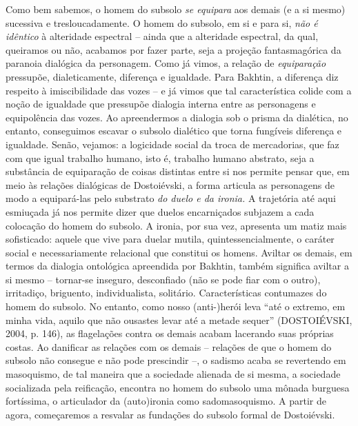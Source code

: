Como bem sabemos, o homem do subsolo \emph{se equipara} aos demais (e a
si mesmo) sucessiva e tresloucadamente. O homem do subsolo, em si e para
si, \emph{não é idêntico} à alteridade espectral -- ainda que a
alteridade espectral, da qual, queiramos ou não, acabamos por fazer
parte, seja a projeção fantasmagórica da paranoia dialógica da
personagem. Como já vimos, a relação de \emph{equiparação} pressupõe,
dialeticamente, diferença e igualdade. Para Bakhtin, a diferença diz
respeito à imiscibilidade das vozes -- e já vimos que tal característica
colide com a noção de igualdade que pressupõe dialogia interna entre as
personagens e equipolência das vozes. Ao apreendermos a dialogia sob o
prisma da dialética, no entanto, conseguimos escavar o subsolo dialético
que torna fungíveis diferença e igualdade. Senão, vejamos: a logicidade
social da troca de mercadorias, que faz com que igual trabalho humano,
isto é, trabalho humano abstrato, seja a substância de equiparação de
coisas distintas entre si nos permite pensar que, em meio às relações
dialógicas de Dostoiévski, a forma articula as personagens de modo a
equipará-las pelo substrato \emph{do duelo e da ironia.} A trajetória
até aqui esmiuçada já nos permite dizer que duelos encarniçados subjazem
a cada colocação do homem do subsolo. A ironia, por sua vez, apresenta
um matiz mais sofisticado: aquele que vive para duelar mutila,
quintessencialmente, o caráter social e necessariamente relacional que
constitui os homens. Aviltar os demais, em termos da dialogia ontológica
apreendida por Bakhtin, também significa aviltar a si mesmo -- tornar-se
inseguro, desconfiado (não se pode fiar com o outro), irritadiço,
briguento, individualista, solitário. Características contumazes do
homem do subsolo. No entanto, como nosso (anti-)herói leva ``até o
extremo, em minha vida, aquilo que não ousastes levar até a metade
sequer'' (DOSTOIÉVSKI, 2004, p. 146), as flagelações contra os demais
acabam lacerando suas próprias costas. Ao danificar as relações com os
demais -- relações de que o homem do subsolo não consegue e não pode
prescindir --, o sadismo acaba se revertendo em masoquismo, de tal
maneira que a sociedade alienada de si mesma, a sociedade socializada
pela reificação, encontra no homem do subsolo uma mônada burguesa
fortíssima, o articulador da (auto)ironia como sadomasoquismo. A partir
de agora, começaremos a resvalar as fundações do subsolo formal de
Dostoiévski.

